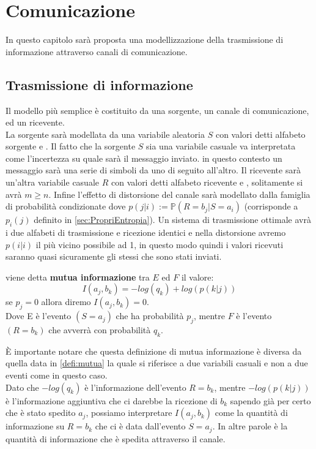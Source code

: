 \chapter{Comunicazione}

In questo capitolo sarà proposta una modellizzazione della trasmissione di informazione attraverso canali di comunicazione. 

\section{Trasmissione di informazione}
\label{sec:Trasmissione}

Il modello più semplice è costituito da una sorgente, un canale di comunicazione, ed un ricevente.\\
La sorgente sarà modellata da una variabile aleatoria $S$ con valori \va detti alfabeto sorgente e \lep. Il fatto che la sorgente $S$ sia una variabile casuale va interpretata come l'incertezza su quale sarà il messaggio inviato. in questo contesto un messaggio sarà una serie di simboli da \va  uno di seguito all'altro.
Il ricevente sarà un'altra variabile casuale $R$ con valori \vb  detti alfabeto ricevente e \leggeq, solitamente si avrà $m \geq n$. Infine l'effetto di distorsione del canale sarà modellato dalla famiglia di probabilità condizionate \lepc  dove $p(j|i):= \mathbb{P}(R=b_j|S=a_i)$ (corrisponde a $p_i(j)$ definito in \ref{sec:PropriEntropia}). Un sistema di trasmissione ottimale avrà i due alfabeti di trasmissione e ricezione identici e nella distorsione avremo $p(i|i)$ il più vicino possibile ad 1, in questo modo quindi i valori ricevuti saranno quasi sicuramente gli stessi che sono stati inviati.\\
\begin{defi}
viene detta \textbf{mutua informazione}  tra $E$ ed $F$ il valore:
\begin{equation}
I(a_j,b_k)=-log(q_k)+ log(p(k|j))
\end{equation}
se $p_j=0$ allora diremo $I(a_j,b_k)=0$.\\
Dove E è l'evento $(S=a_j)$ che ha probabilità $p_j$, mentre $F$ è l'evento $(R=b_k)$ che avverrà con probabilità $q_k$.
\end{defi}
È importante notare che questa definizione di mutua informazione è diversa da quella data in \ref{defi:mutua} la quale si riferisce a due variabili casuali e non a due eventi come in questo caso.\\
Dato che $-log(q_k)$ è l'informazione dell'evento $R=b_k$, mentre $-log(p(k|j))$ è l'informazione aggiuntiva che ci darebbe la ricezione di $b_k$ sapendo già per certo che è stato spedito $a_j$, possiamo interpretare $I(a_j,b_k)$ come la quantità di informazione su $R=b_k$ che ci è data dall'evento $S=a_j$. In altre parole è la quantità di informazione che è spedita attraverso il canale.
